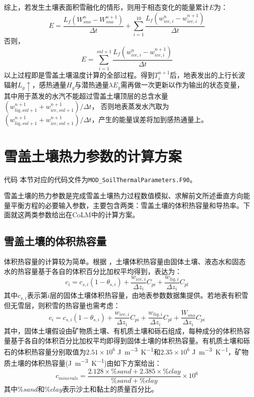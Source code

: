 综上，若发生土壤表面积雪融化的情形，则用于相态变化的能量累计$E$为：
\begin{equation}
E=\frac{L_{f}\left(W_{sno}^{n}-W_{sno}^{n+1}\right)}{\Delta t}+\sum_{i=1}^{10} \frac{L_{f}\left(w_{ice, i}^{n}-w_{ice, i}^{n+1}\right)}{\Delta t}
\end{equation}
否则，
\begin{equation}
E=\sum_{i=1}^{s n l+1} \frac{L_{f}\left(w_{ice, i}^{n}-w_{ice, i}^{n+1}\right)}{\Delta t}
\end{equation}
以上过程即是雪盖土壤温度计算的全部过程。得到$T_i^{n+1}$后，地表发出的上行长波辐射$L_g\uparrow$，感热通量$H_g$与潜热通量$\lambda E_g$需再做一次更新以作为输出的状态变量，
其中用于蒸发的水汽不能超过雪盖土壤顶层的总含水量$\left(w_{liq,snl+1}^{n+1}+w_{ice,snl+1}^{n+1}\right)/\Delta t$，
否则地表蒸发水汽取为$\left(w_{liq,snl+1}^{n+1}+w_{ice,snl+1}^{n+1}\right)/\Delta t$，产生的能量误差将加到感热通量上。


\section{雪盖土壤热力参数的计算方案}\label{sec_thermalpar}
\begin{mymdframed}{代码}
本节对应的代码文件为\texttt{MOD\_SoilThermalParameters.F90}。
\end{mymdframed}

雪盖土壤的热力参数是完成雪盖土壤热力过程数值模拟、求解前文所述垂直方向能量平衡方程的必要输入参数，主要包含两类：雪盖土壤的体积热容量和导热率。下面就这两类参数给出在CoLM中的计算方案。

\subsection{雪盖土壤的体积热容量}

体积热容量的计算较为简单。根据 \citet{de1963thermal}，土壤体积热容量由固体土壤、液态水和固态水的热容量基于各自的体积百分比加权平均得到，表达为：
\begin{equation}
c_{i}=c_{s, i}\left(1-\theta_{s, i}\right)+\frac{w_{ice, i}}{\Delta z_{i}} C_{pi}+\frac{w_{liq, i}}{\Delta z_{i}} C_{p l}
\end{equation}
其中$c_{s,i}$表示第$i$层的固体土壤体积热容量，由地表参数数据集提供。若地表有积雪但无雪层，则积雪的热容量也需考虑：
\begin{equation}
c_{i}=c_{s,i}\left(1-\theta_{s, i}\right)+\frac{w_{ice, i}}{\Delta z_{i}} C_{pi}+\frac{w_{liq,i}}{\Delta z_{i}} C_{pl}+\frac{W_{sno}}{\Delta z_{i}} C_{pi}
\end{equation}
其中，固体土壤假设由矿物质土壤、有机质土壤和砾石组成，每种成分的体积热容量基于各自的体积百分比加权平均即得到固体土壤的体积热容量。有机质土壤和砾石的体积热容量分别取值为$2.51\times 10^6$ \unit{J.m^{-3}.K^{-1}}和$2.35\times 10^6$ \unit{J.m^{-3}.K^{-1}}，矿物质土壤的体积热容量(\unit{J.m^{-3}.K^{-1}})由如下方案给出：$$c_{minerals}=\frac{2.128\times\%sand+2.385\times\%clay}{\%sand+\%clay}\times10^6$$ 
其中$\%sand$和$\%clay$表示沙土和黏土的质量百分比。

